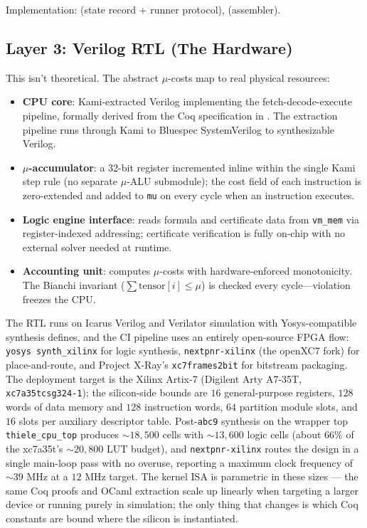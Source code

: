 Implementation:  (state record + runner protocol),  (assembler).

\subsection{Layer 3: Verilog RTL (The Hardware)}

This isn't theoretical. The abstract $\mu$-costs map to real physical resources:

\begin{itemize}
    \item \textbf{CPU core}: Kami-extracted Verilog implementing the fetch-decode-execute pipeline, formally derived from the Coq specification in . The extraction pipeline runs through Kami to Bluespec SystemVerilog to synthesizable Verilog.

    \item \textbf{$\mu$-accumulator}: a 32-bit register incremented inline within the single Kami step rule (no separate $\mu$-ALU submodule); the cost field of each instruction is zero-extended and added to \texttt{mu} on every cycle when an instruction executes.

    \item \textbf{Logic engine interface}: reads formula and certificate data from \texttt{vm\_mem} via register-indexed addressing; certificate verification is fully on-chip with no external solver needed at runtime.

    \item \textbf{Accounting unit}: computes $\mu$-costs with hardware-enforced monotonicity. The Bianchi invariant ($\sum\text{tensor}[i] \le \mu$) is checked every cycle---violation freezes the CPU.
\end{itemize}

The RTL runs on Icarus Verilog and Verilator simulation with Yosys-compatible synthesis defines, and the CI pipeline uses an entirely open-source FPGA flow: \texttt{yosys synth\_xilinx} for logic synthesis, \texttt{nextpnr-xilinx} (the openXC7 fork) for place-and-route, and Project X-Ray's \texttt{xc7frames2bit} for bitstream packaging. The deployment target is the Xilinx Artix-7 (Digilent Arty A7-35T, \texttt{xc7a35tcsg324-1}); the silicon-side bounds are $16$ general-purpose registers, $128$ words of data memory and $128$ instruction words, $64$ partition module slots, and $16$ slots per auxiliary descriptor table. Post-\texttt{abc9} synthesis on the wrapper top \texttt{thiele\_cpu\_top} produces $\sim 18{,}500$ cells with $\sim 13{,}600$ logic cells (about $66\%$ of the xc7a35t's $\sim 20{,}800$ LUT budget), and \texttt{nextpnr-xilinx} routes the design in a single main-loop pass with no overuse, reporting a maximum clock frequency of $\sim 39$ MHz at a $12$ MHz target. The kernel ISA is parametric in these sizes --- the same Coq proofs and OCaml extraction scale up linearly when targeting a larger device or running purely in simulation; the only thing that changes is which Coq constants are bound where the silicon is instantiated.

